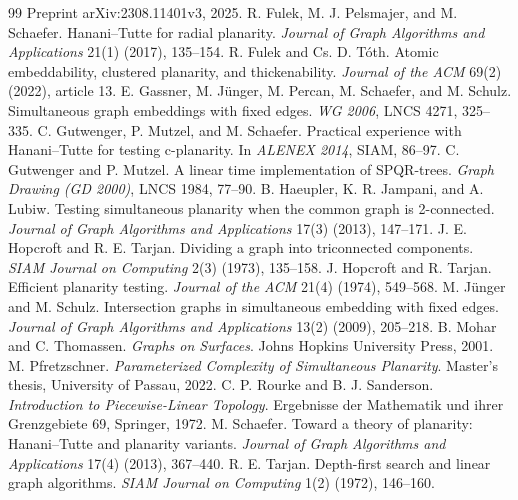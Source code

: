 \begin{thebibliography}{99}
Preprint arXiv:2308.11401v3, 2025.
 R. Fulek, M. J. Pelsmajer, and M. Schaefer.
Hanani--Tutte for radial planarity.
\emph{Journal of Graph Algorithms and Applications} 21(1) (2017), 135--154.
 R. Fulek and Cs. D. T\'oth.
Atomic embeddability, clustered planarity, and thickenability.
\emph{Journal of the ACM} 69(2) (2022), article 13.
 E. Gassner, M. J\"unger, M. Percan, M. Schaefer, and M. Schulz.
Simultaneous graph embeddings with fixed edges.
\emph{WG 2006}, LNCS 4271, 325--335.
 C. Gutwenger, P. Mutzel, and M. Schaefer.
Practical experience with Hanani--Tutte for testing c-planarity.
In \emph{ALENEX 2014}, SIAM, 86--97.
 C. Gutwenger and P. Mutzel.
A linear time implementation of SPQR-trees.
\emph{Graph Drawing (GD 2000)}, LNCS 1984, 77--90.
 B. Haeupler, K. R. Jampani, and A. Lubiw.
Testing simultaneous planarity when the common graph is 2-connected.
\emph{Journal of Graph Algorithms and Applications} 17(3) (2013), 147--171.
 J. E. Hopcroft and R. E. Tarjan.
Dividing a graph into triconnected components.
\emph{SIAM Journal on Computing} 2(3) (1973), 135--158.
 J. Hopcroft and R. Tarjan.
Efficient planarity testing.
\emph{Journal of the ACM} 21(4) (1974), 549--568.
 M. J\"unger and M. Schulz.
Intersection graphs in simultaneous embedding with fixed edges.
\emph{Journal of Graph Algorithms and Applications} 13(2) (2009), 205--218.
 B. Mohar and C. Thomassen.
\emph{Graphs on Surfaces}. Johns Hopkins University Press, 2001.
 M. Pfretzschner.
\emph{Parameterized Complexity of Simultaneous Planarity}.
Master's thesis, University of Passau, 2022.
 C. P. Rourke and B. J. Sanderson.
\emph{Introduction to Piecewise-Linear Topology}.
Ergebnisse der Mathematik und ihrer Grenzgebiete 69, Springer, 1972.
 M. Schaefer.
Toward a theory of planarity: Hanani--Tutte and planarity variants.
\emph{Journal of Graph Algorithms and Applications} 17(4) (2013), 367--440.
 R. E. Tarjan.
Depth-first search and linear graph algorithms.
\emph{SIAM Journal on Computing} 1(2) (1972), 146--160.
\end{thebibliography}
